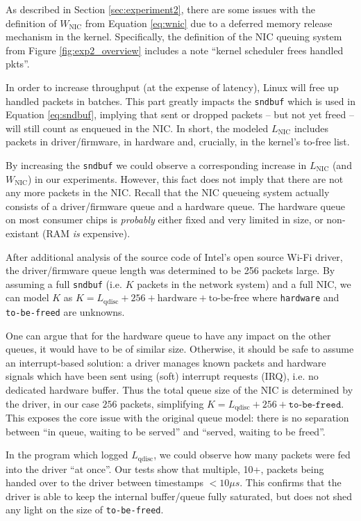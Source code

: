 As described in Section \ref{sec:experiment2}, there are some issues with the
definition of $W_\text{NIC}$ from Equation \ref{eq:wnic} due to a deferred
memory release mechanism in the kernel. Specifically, the definition of the
NIC queuing system from Figure \ref{fig:exp2_overview} includes a note
``kernel scheduler frees handled pkts''.

In order to increase throughput (at the expense of latency), Linux will free
up handled packets in batches. This part greatly impacts the \texttt{sndbuf}
which is used in Equation \ref{eq:sndbuf}, implying that sent or dropped
packets -- but not yet freed -- will still count as enqueued in the NIC. In
short, the modeled $L_\text{NIC}$ includes packets in driver/firmware, in
hardware and, crucially, in the kernel's to-free list.

By increasing the \texttt{sndbuf} we could observe a corresponding increase in
$L_\text{NIC}$ (and $W_\text{NIC}$) in our experiments. However, this fact
does not imply that there are not any more packets in the NIC. Recall that the
NIC queueing system actually consists of a driver/firmware queue and a
hardware queue. The hardware queue on most consumer chips is \emph{probably}
either fixed and very limited in size, or non-existant (RAM \emph{is}
expensive).

After additional analysis of the source code of Intel's open source Wi-Fi
driver, the driver/firmware queue length was determined to be 256 packets
large. By assuming a full \texttt{sndbuf} (i.e. $K$ packets in the network
system) and a full NIC, we can model $K$ as $K = L_\text{qdisc} + 256 +
\text{hardware} + \text{to-be-free}$ where \texttt{hardware} and
\texttt{to-be-freed} are unknowns.

One can argue that for the hardware queue to have any impact on the other
queues, it would have to be of similar size. Otherwise, it should be safe to
assume an interrupt-based solution: a driver manages known packets and
hardware signals which have been sent using (soft) interrupt requests (IRQ),
i.e. no dedicated hardware buffer. Thus the total queue size of the NIC is
determined by the driver, in our case $256$ packets, simplifying $K =
L_\text{qdisc} + 256 + \texttt{to-be-freed}$. This exposes the core issue with
the original queue model: there is no separation between ``in queue, waiting
to be served'' and ``served, waiting to be freed''.

In the program which logged $L_\text{qdisc}$, we could observe how many
packets were fed into the driver ``at once''. Our tests show that multiple,
10+, packets being handed over to the driver between timestamps $<10 \mu s$.
This confirms that the driver is able to keep the internal buffer/queue fully
saturated, but does not shed any light on the size of \texttt{to-be-freed}.


